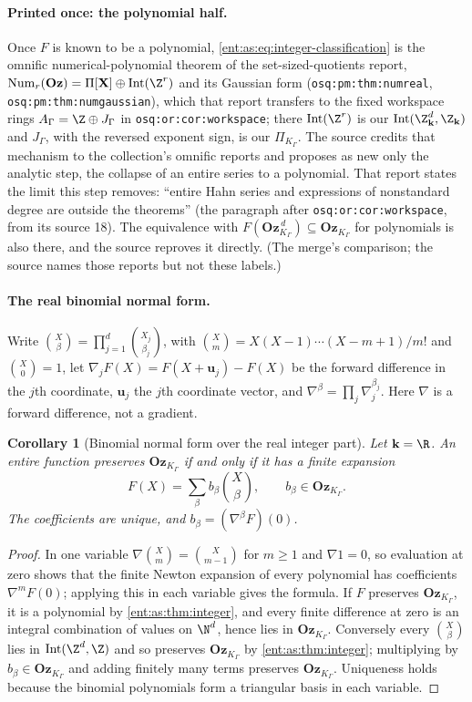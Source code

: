 \documentclass[11pt]{article}
\theoremstyle{plain}
\theoremstyle{plain}
\theoremstyle{plain}
\newtheorem{corollary}[corollary]{Corollary}
\theoremstyle{definition}
\theoremstyle{definition}
\theoremstyle{definition}
\theoremstyle{definition}
\theoremstyle{remark}
\newcommand{\K}{K_\Gamma}\newcommand{\KD}{K_\Delta}
\newcommand{\kk}{\mathbf k}\newcommand{\PP}{\mathbb P}
\newcommand{\Oz}{\mathbf{Oz}}\newcommand{\Ed}{\mathcal E_{\Gamma,d}}
\newcommand{\Zk}{\Z_{\kk}}\newcommand{\OzK}{\Oz_{\K}}
\newcommand{\PiK}{\Pi_{\K}}\newcommand{\pg}{\mathsf p}
\DeclareMathOperator{\Int}{Int}\DeclareMathOperator{\ct}{ct}
\begin{document}
\paragraph{Printed once: the polynomial half.} Once $F$ is known to be a
polynomial, \eqref{ent:as:eq:integer-classification} is the omnific
numerical-polynomial theorem of the set-sized-quotients report,
$\operatorname{Num}_r(\Oz)=\Pi[\mathbf X]\oplus\Int(\Z^r)$ and its Gaussian form
(\texttt{osq:pm:thm:numreal}, \texttt{osq:pm:thm:numgaussian}), which that report
transfers to the fixed workspace rings $A_\Gamma=\Z\oplus J_\Gamma$ in
\texttt{osq:or:cor:workspace}; there $\Int(\Z^r)$ is our $\Int(\Zk^d,\Zk)$ and
$J_\Gamma$, with the reversed exponent sign, is our $\PiK$. The source credits
that mechanism to the collection's omnific reports and proposes as new only
the analytic step, the collapse of an entire series to a polynomial. That
report states the limit this step removes: ``entire Hahn series and
expressions of nonstandard degree are outside the theorems'' (the paragraph
after \texttt{osq:or:cor:workspace}, from its source 18). The equivalence with
$F(\OzK^{\,d})\subseteq\OzK$ for polynomials is also there, and the source
reproves it directly. (The merge's comparison; the source names
those reports but not these labels.)

\paragraph{The real binomial normal form.} Write
$\binom{X}{\beta}=\prod_{j=1}^d\binom{X_j}{\beta_j}$, with
$\binom{X}{m}=X(X-1)\cdots(X-m+1)/m!$ and $\binom X0=1$, let
$\nabla_jF(X)=F(X+\mathbf u_j)-F(X)$ be the forward difference in the $j$th
coordinate, $\mathbf u_j$ the $j$th coordinate vector, and
$\nabla^\beta=\prod_j\nabla_j^{\beta_j}$. Here $\nabla$ is a forward
difference, not a gradient.

\begin{corollary}[Binomial normal form over the real integer part]
\label{ent:as:cor:binomial}
Let $\kk=\R$. An entire function preserves $\OzK$ if and only if it has a
finite expansion
\begin{equation}\label{ent:as:eq:binomial}
 F(X)=\sum_\beta b_\beta\binom X\beta,\qquad b_\beta\in\OzK .
\end{equation}
The coefficients are unique, and $b_\beta=(\nabla^\beta F)(0)$.
\end{corollary}
\begin{proof}
In one variable $\nabla\binom Xm=\binom X{m-1}$ for $m\ge1$ and $\nabla1=0$, so
evaluation at zero shows that the finite Newton expansion of every polynomial
has coefficients $\nabla^mF(0)$; applying this in each variable gives the
formula. If $F$ preserves $\OzK$, it is a polynomial by
\cref{ent:as:thm:integer}, and every finite difference at zero is an integral
combination of values on $\N^d$, hence lies in $\OzK$. Conversely every
$\binom X\beta$ lies in $\Int(\Z^d,\Z)$ and so preserves $\OzK$ by
\cref{ent:as:thm:integer}; multiplying by $b_\beta\in\OzK$ and adding finitely
many terms preserves $\OzK$. Uniqueness holds because the binomial polynomials
form a triangular basis in each variable.
\end{proof}
\end{document}
